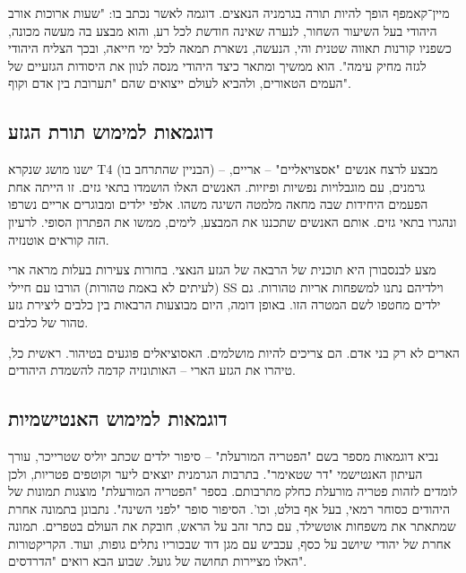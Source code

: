 \documentclass[]{article}
\begin{document}
	מיין־קאמפף הופך להיות תורה בגרמניה הנאצים. דוגמה לאשר נכתב בו: "שעות ארוכות אורב היהודי בעל השיעור השחור, לנערה שאינה חודשת לכל רע, והוא מבצע בה מעשה מכונה, כשפניו קורנות תאווה שטנית והי, הנעשה, נשארת תמאה לכל ימי חייאה, ובכך הצליח היהודי לגזה מחיק עימה". הוא ממשיך ומתאר כיצד היהודי מנסה לנוון את היסודות הגזעיים של העמים הטאורים, ולהביא לעולם ייצואים שהם "תערובת בין אדם וקוף". 
	
	\subsection{דוגמאות למימוש תורת הגזע}
	
	ישנו מושג שנקרא T4 (הבניין שהתרחב בו) – מבצע לרצח אנשים "אסצויאליים" – אריים, גרמנים, עם מוגבלויות נפשיות ופיזיות. האנשים האלו הושמדו בתאי גזים. זו הייתה אחת הפעמים היחידות שבה מחאה מלמטה השיגה משהו. אלפי ילדים ומבוגרים אריים נשרפו ונהגרו בתאי גזים. אותם האנשים שתכננו את המבצע, לימים, ממשו את הפתרון הסופי. לרעיון הזה קוראים אוטנזיה. 
	
	מצע לבנסבורן היא תוכנית של הרבאה של הגזע הנאצי. בחורות צעירות בעלות מראה ארי (לעיתים לא באמת טהורות) הורבו עם חיילי SS וילדיהם נתנו למשפחות אריות טהורות. גם ילדים מחטפו לשם המטרה הזו. באופן דומה, היום מבוצעות הרבאות בין כלבים ליצירת גזע טהור של כלבים. 
	
	הארים לא רק בני אדם. הם צריכים להיות מושלמים. האסוציאלים פוגעים בטיהור. ראשית כל, טיהרו את הגזע הארי – האותונזיה קדמה להשמדת היהודים. 
	
	\subsection{דוגמאות למימוש האנטישמיות}
	נביא דוגמאות מספר בשם "הפטריה המורעלת" – סיפור ילדים שכתב יוליס שטרייכר, עורך העיתון האנטישמי "דר שטאימר". בתרבות הגרמנית יוצאים ליער וקוטפים פטריות, ולכן לומדים לזהות פטריה מורעלת כחלק מתרבותם. בספר "הפטריה המורעלת" מוצגות תמונות של היהודים כסוחר רמאי, בעל אף בולט, וכו'. הסיפור סופר "לפני השינה". נתבונן בתמונה  אחרת שמתאתר את משפחות אוטשילד, עם כתר זהב על הראש, חובקת את העולם בטפרים. תמונה אחרת של יהודי שיושב על כסף, עכביש עם מגן דוד שבכוריו נתלים גופות, ועוד. הקריקטורות האלו מציירות תחושה של גועל. שבוע הבא רואים "הדרדסים". 
	
	
\end{document}
